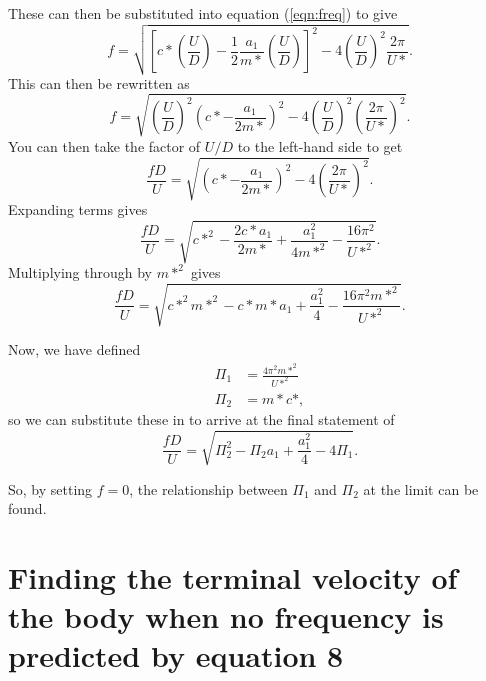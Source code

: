 These can then be substituted into equation (\ref{eqn:freq}) to give
\begin{equation}
f = \sqrt{\left[c*\left(\frac{U}{D}\right) - \frac{1}{2}\frac{a_1}{m*}\left(\frac{U}{D}\right)\right]^2 - 4\left(\frac{U}{D}\right)^2\frac{2\pi}{U*}}.
\end{equation}
This can then be rewritten as
\begin{equation}
  f = \sqrt{\left(\frac{U}{D}\right)^2\left(c*-\frac{a_1}{2m*}\right)^2 - 4\left(\frac{U}{D}\right)^2\left(\frac{2\pi}{U*}\right)^2}.
\end{equation}
You can then take the factor of $U/D$ to the left-hand side to get
\begin{equation}
  \frac{fD}{U} = \sqrt{\left(c*-\frac{a_1}{2m*}\right)^2 - 4\left(\frac{2\pi}{U*}\right)^2}.
\end{equation}
Expanding terms gives
\begin{equation}
  \frac{fD}{U} = \sqrt{c*^2 - \frac{2c*a_1}{2m*} + \frac{a_1^2}{4m*^2} - \frac{16\pi^2}{U*^2}}.
\end{equation}
Multiplying through by $m*^2$ gives
\begin{equation}
  \frac{fD}{U} = \sqrt{c*^2m*^2 - c*m*a_1 + \frac{a_1^2}{4} - \frac{16\pi^2m*^2}{U*^2}}.
\end{equation}

Now, we have defined
\begin{align}
  \Pi_1 &= \frac{4\pi^2m*^2}{U*^2} \\
  \Pi_2 &= m*c*,
\end{align}
so we can substitute these in to arrive at the final statement of
\begin{equation}
  \label{eqn_freq_final}
  \frac{fD}{U} = \sqrt{\Pi_2^2 - \Pi_2a_1 + \frac{a_1^2}{4} - 4\Pi_1}.
\end{equation}

So, by setting $f=0$, the relationship between $\Pi_1$ and $\Pi_2$ at
the limit can be found.

\section{Finding the terminal velocity of the body when no frequency
  is predicted by equation 8}

